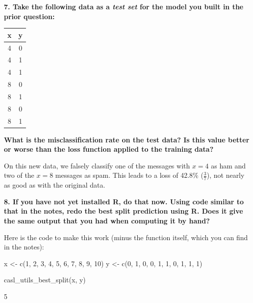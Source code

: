 \documentclass[12pt,hidelinks]{article}
\numberwithin{equation}{section}
\begin{document}
\vspace*{12pt}

\textbf{7. Take the following data as a \textit{test set} for the model you built
in the prior question:}

\begin{center}
\begin{tabular}{cc}
x & y \\ \hline
4 & 0 \\
4 & 1 \\
4 & 1 \\
8 & 0 \\
8 & 1 \\
8 & 0 \\
8 & 1 \\
\end{tabular}
\end{center}

\textbf{What is the misclassification rate on the test data? Is this value better or
worse than the loss function applied to the training data?}

\vspace*{12pt}

On this new data, we falsely classify one of the messages with $x=4$ as ham
and two of the $x=8$ messages as spam. This leads to a loss of 42.8\% ($\frac{3}{7}$),
not nearly as good as with the original data.

\vspace*{12pt}

\textbf{8. If you have not yet installed R, do that now. Using code similar to
that in the notes, redo the best split prediction using R. Does it give the
same output that you had when computing it by hand?}

\vspace*{12pt}

Here is the code to make this work (minus the function itself, which you can
find in the notes):


\begin{rcode}
x <- c(1, 2, 3, 4, 5, 6, 7, 8, 9, 10)
y <- c(0, 1, 0, 0, 1, 1, 0, 1, 1, 1)

casl_utils_best_split(x, y)
\end{rcode}
\begin{rres}
[1] 5
\end{rres}
\end{document}
